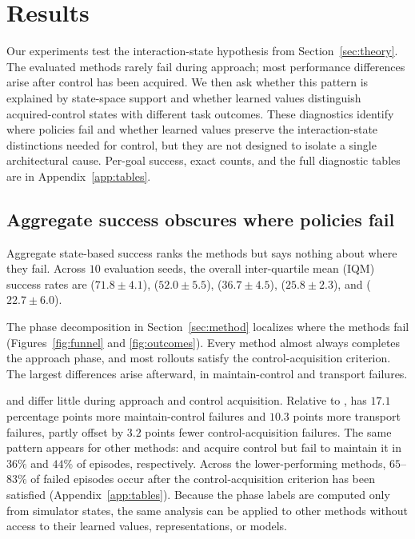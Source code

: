 \section{Results}
\label{sec:results}

Our experiments test the interaction-state hypothesis from Section~\ref{sec:theory}.
The evaluated methods rarely fail during approach; most performance differences arise after control has been acquired.
We then ask whether this pattern is explained by state-space support and whether learned values distinguish acquired-control states with different task outcomes.
These diagnostics identify where policies fail and whether learned values preserve the interaction-state distinctions needed for control, but they are not designed to isolate a single architectural cause.
Per-goal success, exact counts, and the full diagnostic tables are in Appendix~\ref{app:tables}.

\subsection{Aggregate success obscures where policies fail}

Aggregate state-based success ranks the methods but says nothing about where they fail. 
Across $10$ evaluation seeds, the overall inter-quartile mean (IQM)~\citep{agarwal-neurips21a} success rates are \gciql{} ($71.8 \pm 4.1$), \fb{} ($52.0 \pm 5.5$), \psm{} ($36.7 \pm 4.5$), \crl{} ($25.8 \pm 2.3$), and \rldp{} ($22.7 \pm 6.0$).\protect\footnotemark{}

The phase decomposition in Section~\ref{sec:method} localizes where the methods fail (Figures~\ref{fig:funnel} and \ref{fig:outcomes}).
Every method almost always completes the approach phase, and most rollouts satisfy the control-acquisition criterion.
The largest differences arise afterward, in maintain-control and transport failures.

\fb{} and \gciql{} differ little during approach and control acquisition.
Relative to \gciql{}, \fb{} has $17.1$ percentage points more maintain-control failures and $10.3$ points more transport failures, partly offset by $3.2$ points fewer control-acquisition failures.
The same pattern appears for other methods: \psm{} and \rldp{} acquire control but fail to maintain it in $36\%$ and $44\%$ of episodes, respectively.
Across the lower-performing methods, $65$--$83\%$ of failed episodes occur after the control-acquisition criterion has been satisfied (Appendix~\ref{app:tables}).
Because the phase labels are computed only from simulator states, the same analysis can be applied to other methods without access to their learned values, representations, or models.

